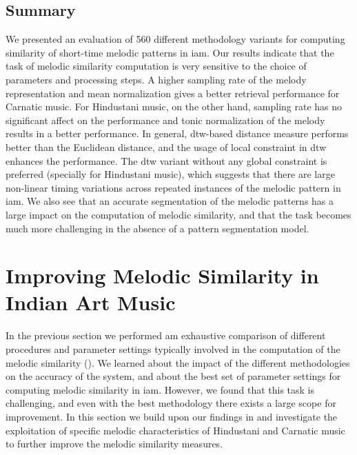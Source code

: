 \subsection{Summary}
\label{sec:patterns_melodic_similarity_conclusion}

We presented an evaluation of 560 different methodology variants for computing similarity of short-time melodic patterns in \gls{iam}. Our results indicate that the task of melodic similarity computation is very sensitive to the choice of parameters and processing steps. A higher sampling rate of the melody representation and mean normalization gives a better retrieval performance for Carnatic music. For Hindustani music, on the other hand, sampling rate has no significant affect on the performance and tonic normalization of the melody results in a better performance. In general, \gls{dtw}-based distance measure performs better than the Euclidean distance, and the usage of local constraint in \gls{dtw} enhances the performance. The \gls{dtw} variant without any global constraint is preferred (specially for Hindustani music), which suggests that there are large non-linear timing variations across repeated instances of the melodic pattern in \gls{iam}. We also see that an accurate segmentation of the melodic patterns has a large impact on the computation of melodic similarity, and that the task becomes much more challenging in the absence of a pattern segmentation model.



\section{Improving Melodic Similarity in Indian Art Music}
\label{sec:patterns_improving_melodic_similarity}

In the previous section we performed am exhaustive comparison of different procedures and parameter settings typically involved in the computation of the melodic similarity (). We learned about the impact of the different methodologies on the accuracy of the system, and about the best set of parameter settings for computing melodic similarity in \gls{iam}. However, we found that this task is challenging, and even with the best methodology there exists a large scope for improvement. In this section we build upon our findings in  and investigate the exploitation of specific melodic characteristics of Hindustani and Carnatic music to further improve the melodic similarity measures. 

